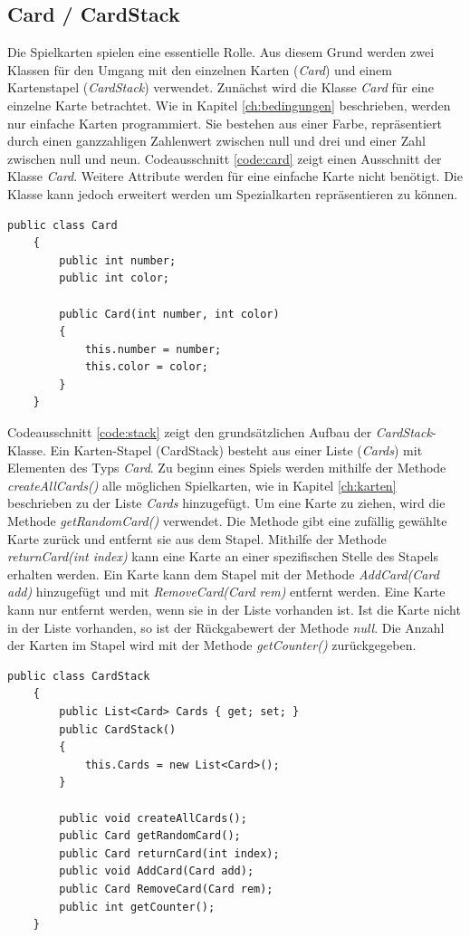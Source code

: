 \subsection{Card / CardStack}
\label{ch:card}
Die Spielkarten spielen eine essentielle Rolle. Aus diesem Grund werden zwei Klassen für den Umgang mit den einzelnen Karten (\textit{Card}) und einem Kartenstapel (\textit{CardStack}) verwendet. Zunächst wird die Klasse \textit{Card} für eine einzelne Karte betrachtet. Wie in Kapitel \ref{ch:bedingungen} beschrieben, werden nur einfache Karten programmiert. Sie bestehen aus einer Farbe, repräsentiert durch einen ganzzahligen Zahlenwert zwischen null und drei und einer Zahl zwischen null und neun. Codeausschnitt \ref{code:card} zeigt einen Ausschnitt der Klasse \textit{Card}. Weitere Attribute werden für eine einfache Karte nicht benötigt. Die Klasse kann jedoch erweitert werden um Spezialkarten repräsentieren zu können.
\begin{lstlisting}[label={code:card}, caption={Codeausschnitt Klasse \textit{Card}}]
	public class Card
	{
		public int number;
		public int color;
		
		public Card(int number, int color)
		{
			this.number = number;
			this.color = color;
		}
	}
\end{lstlisting}
Codeausschnitt \ref{code:stack} zeigt den grundsätzlichen Aufbau der \textit{CardStack}-Klasse. Ein Karten-Stapel (CardStack) besteht aus einer Liste (\textit{Cards}) mit Elementen des Typs \textit{Card}. Zu beginn eines Spiels werden mithilfe der Methode \textit{createAllCards()} alle möglichen Spielkarten, wie in Kapitel \ref{ch:karten} beschrieben zu der Liste \textit{Cards} hinzugefügt. Um eine Karte zu ziehen, wird die Methode \textit{getRandomCard()} verwendet. Die Methode gibt eine zufällig gewählte Karte zurück und entfernt sie aus dem Stapel. Mithilfe der Methode \textit{returnCard(int index)} kann eine Karte an einer spezifischen Stelle des Stapels erhalten werden. Ein Karte kann dem Stapel mit der Methode \textit{AddCard(Card add)} hinzugefügt und mit \textit{RemoveCard(Card rem)} entfernt werden. Eine Karte kann nur entfernt werden, wenn sie in der Liste vorhanden ist. Ist die Karte nicht in der Liste vorhanden, so ist der Rückgabewert der Methode \textit{null}. Die Anzahl der Karten im Stapel wird mit der Methode \textit{getCounter()} zurückgegeben.
\begin{lstlisting}[label={code:stack}, caption={Codeausschnitt Klasse \textit{CardStack}}]
	public class CardStack
	{
		public List<Card> Cards { get; set; }
		public CardStack()
		{
			this.Cards = new List<Card>();
		}
		
		public void createAllCards();
		public Card getRandomCard();
		public Card returnCard(int index);
		public void AddCard(Card add);
		public Card RemoveCard(Card rem);
		public int getCounter();
	}
\end{lstlisting}
